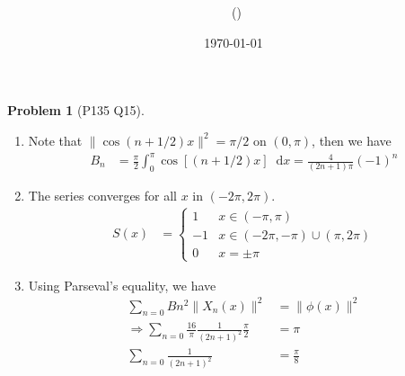 \documentclass[twoside,11pt]{article}
\title{{\sffamily \Code \ \Ass}}
\author{\sffamily \name \ (\href{mailto:\mail}{\mail})}
\date{\sffamily \today}
\makeatletter
\renewcommand*\d{\mathop{}\!\mathrm{d}}
\theoremstyle{definition}
\newtheorem{problem}{Problem}
\theoremstyle{remark}
\newtheorem*{remark}{Remark}
\renewcommand{\maketitle}{\bgroup\setlength{\parindent}{0pt}
\begin{flushleft}
  \textbf{\Large\@title}

  \@author
\end{flushleft}\egroup
}
\makeatother
\begin{document}
\maketitle
\thispagestyle{title}



\begin{problem}[P135 Q15]\
\begin{enumerate}[label=(\alph*)]
\item Note that $\|\cos(n+1/2)x\|^2=\pi/2$ on $(0, \pi)$, 
then we have
\begin{align*}
    B_n &= \frac{\pi}{2}\int_0^\pi\cos[(n+1/2)x]\d x = \frac{4}{(2n+1)\pi}(-1)^n
\end{align*}

\item The series converges for all $x$ in $(-2\pi, 2\pi)$.
\begin{align*}
    S(x) &= \begin{cases}
        1 & x\in(-\pi, \pi)\\
        -1 & x\in(-2\pi, -\pi)\cup (\pi, 2\pi)\\
        0 & x=\pm\pi
    \end{cases}
\end{align*}

\item Using Parseval's equality, we have
\begin{align*}
    \sum_{n=0} Bn^2\|X_n(x)\|^2 &= \|\phi(x)\|^2\\
    \Rightarrow \sum_{n=0} \frac{16}{\pi}\frac{1}{(2n+1)^2}\frac{\pi}{2} &= \pi\\
    \sum_{n=0} \frac{1}{(2n+1)^2} &= \frac{\pi}{8}
\end{align*}

\end{enumerate}
\end{problem}
\end{document}

